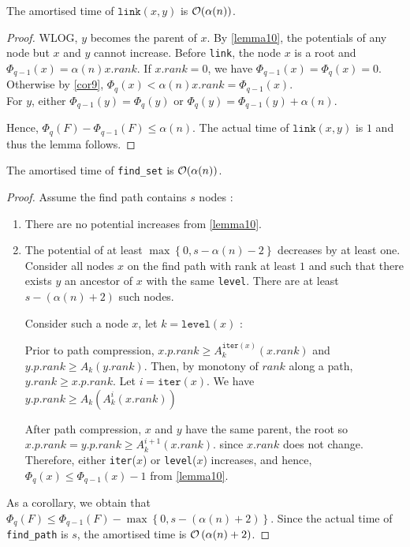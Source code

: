 \documentclass{cours}
\begin{document}
\begin{lemma}
    The amortised time of $\texttt{link}(x, y)$ is $\mathcal{O}(\alpha(n))$.
\end{lemma}
\begin{proof}
    WLOG, $y$ becomes the parent of $x$. By \ref{lemma10}, the potentials of any node but $x$ and $y$ cannot increase. Before \texttt{link}, the node $x$ is a root and $\Phi_{q - 1}(x) = \alpha(n)x.rank$. If $x.rank = 0$, we have $\Phi_{q - 1}(x) = \Phi_{q}(x) = 0$. Otherwise by \ref{cor9}, $\Phi_{q}(x) < \alpha(n)x.rank = \Phi_{q - 1}(x)$.\\
    For $y$, either $\Phi_{q - 1}(y) = \Phi_{q}(y)$ or $\Phi_{q}(y) = \Phi_{q - 1}(y) + \alpha(n)$.

    Hence, $\Phi_{q}(F) - \Phi_{q - 1}(F) \leq \alpha(n)$. The actual time of $\texttt{link}(x, y)$ is $1$ and thus the lemma follows. 
\end{proof}

\begin{lemma}
    The amortised time of \texttt{find\_set} is $\mathcal{O}(\alpha(n))$.
\end{lemma}
\begin{proof}
    Assume the find path contains $s$ nodes : 
    \begin{enumerate}
        \item There are no potential increases from \ref{lemma10}.
        \item The potential of at least $\max \left\{0, s - \alpha(n) - 2\right\}$ decreases by at least one.
        Consider all nodes $x$ on the find path with rank at least $1$ and such that there exists $y$ an ancestor of $x$ with the same \texttt{level}. There are at least $s - \left(\alpha(n) + 2\right)$ such nodes. 

        Consider such a node $x$, let $k = \texttt{level}(x)$ : 
        
        Prior to path compression, $x.p.rank \geq A_{k}^{\texttt{iter}(x)}(x.rank)$ and $y.p.rank \geq A_{k}(y.rank)$. Then, by monotony of $rank$ along a path, $y.rank \geq x.p.rank$. Let $i = \texttt{iter}(x)$. We have $y.p.rank \geq A_{k}\left(A_{k}^{i}(x.rank)\right)$

        After path compression, $x$ and $y$ have the same parent, the root so $x.p.rank = y.p.rank \geq A_{k}^{i + 1}(x.rank)$. since $x.rank$ does not change. Therefore, either \texttt{iter}($x$) or \texttt{level}($x$) increases, and hence, $\Phi_{q}(x) \leq \Phi_{q - 1}(x) - 1$ from \ref{lemma10}.
    \end{enumerate}
    As a corollary, we obtain that $\Phi_{q}(F) \leq \Phi_{q - 1}(F) - \max \left\{0, s - \left(\alpha(n) + 2\right)\right\}$. Since the actual time of \texttt{find\_path} is $s$, the amortised time is $\mathcal{O}\left(\alpha(n) + 2\right)$.
\end{proof}
\end{document}
